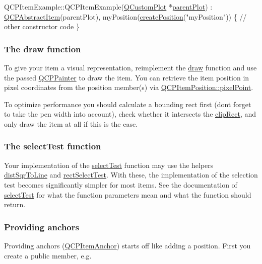 \begin{DoxyCode}
QCPItemExample::QCPItemExample(\hyperlink{classQCustomPlot}{QCustomPlot} *\hyperlink{classQCPLayerable_ab7e0e94461566093d36ffc0f5312b109}{parentPlot}) :
  \hyperlink{classQCPAbstractItem}{QCPAbstractItem}(parentPlot),
  myPosition(\hyperlink{classQCPAbstractItem_a75036d39c4d4e2e1a7dd145fff915d32}{createPosition}(\textcolor{stringliteral}{"myPosition"}))
\{
  \textcolor{comment}{// other constructor code}
\}
\end{DoxyCode}
\hypertarget{classQCPAbstractItem_items-drawing}{}\subsubsection{The draw function}\label{classQCPAbstractItem_items-drawing}
To give your item a visual representation, reimplement the \hyperlink{classQCPAbstractItem_ad0dc056f650c3ca73414e6b4f01674ef}{draw} function and use the passed \hyperlink{classQCPPainter}{Q\+C\+P\+Painter} to draw the item. You can retrieve the item position in pixel coordinates from the position member(s) via \hyperlink{classQCPItemPosition_ae490f9c76ee2ba33752c495d3b6e8fb5}{Q\+C\+P\+Item\+Position\+::pixel\+Point}.

To optimize performance you should calculate a bounding rect first (don\textquotesingle{}t forget to take the pen width into account), check whether it intersects the \hyperlink{classQCPAbstractItem_a538e25ff8856534582f5b2b400a46405}{clip\+Rect}, and only draw the item at all if this is the case.\hypertarget{classQCPAbstractItem_items-selection}{}\subsubsection{The select\+Test function}\label{classQCPAbstractItem_items-selection}
Your implementation of the \hyperlink{classQCPAbstractItem_a96d522d10ffc0413b9a366c6f7f0476b}{select\+Test} function may use the helpers \hyperlink{classQCPAbstractItem_acdca343717d625b8abb3c3e38c0ed39d}{dist\+Sqr\+To\+Line} and \hyperlink{classQCPAbstractItem_a4c0e14c4e92df91174cb7183fb363069}{rect\+Select\+Test}. With these, the implementation of the selection test becomes significantly simpler for most items. See the documentation of \hyperlink{classQCPAbstractItem_a96d522d10ffc0413b9a366c6f7f0476b}{select\+Test} for what the function parameters mean and what the function should return.\hypertarget{classQCPAbstractItem_anchors}{}\subsubsection{Providing anchors}\label{classQCPAbstractItem_anchors}
Providing anchors (\hyperlink{classQCPItemAnchor}{Q\+C\+P\+Item\+Anchor}) starts off like adding a position. First you create a public member, e.\+g.


